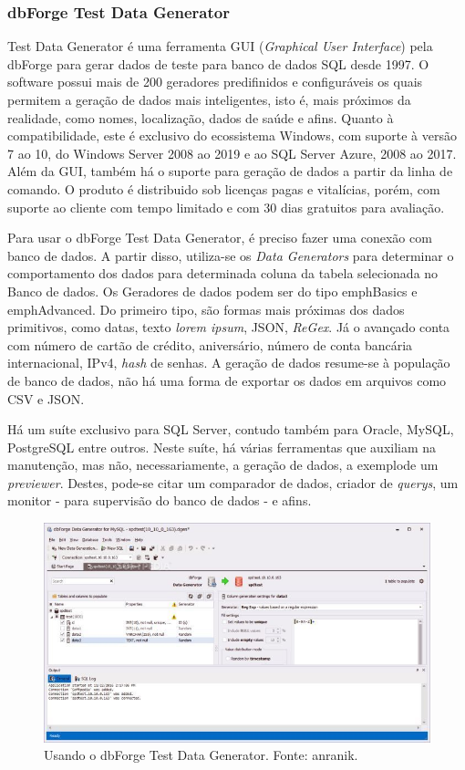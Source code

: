 \documentclass[
	12pt,				%
	openright,			%
	twoside,			%
	a4paper,			%
	english,			%
	brazil				%
	]{abntex2}
\begin{document}
	\subsubsection{dbForge Test Data Generator}
	Test Data Generator \cite{forgeDBDataGenerator} é uma ferramenta GUI (\emph{Graphical User Interface}) pela dbForge para gerar dados de teste para banco de dados SQL desde 1997.
	O software possui mais de 200 geradores predifinidos e configuráveis os quais permitem a geração de dados mais inteligentes, isto é, mais próximos da realidade, como nomes, localização, dados de saúde e afins.
	Quanto à compatibilidade, este é exclusivo do ecossistema Windows, com suporte à versão 7 ao 10, do Windows Server 2008 ao 2019 e ao SQL Server Azure, 2008 ao 2017.
	Além da GUI, também há o suporte para geração de dados a partir da linha de comando.
	O produto é distribuido sob licenças pagas e vitalícias, porém, com suporte ao cliente com tempo limitado e com 30 dias gratuitos para avaliação.
	\par
	Para usar o dbForge Test Data Generator, é preciso fazer uma conexão com banco de dados. 
	A partir disso, utiliza-se os \emph{Data Generators} para determinar o comportamento dos dados para determinada coluna da tabela selecionada no Banco de dados.
	Os Geradores de dados podem ser do tipo emph{Basics} e emph{Advanced}. 
	Do primeiro tipo, são formas mais próximas dos dados primitivos, como datas, texto \emph{lorem ipsum}, JSON, \emph{ReGex}.
	Já o avançado conta com número de cartão de crédito, aniversário, número de conta bancária internacional, IPv4, \emph{hash} de senhas.  
	A geração de dados resume-se à população de banco de dados, não há uma forma de exportar os dados em arquivos como CSV e JSON.
	\par
	Há um suíte exclusivo para SQL Server, contudo também para Oracle, MySQL, PostgreSQL entre outros.
	Neste suíte, há várias ferramentas que auxiliam na manutenção, mas não, necessariamente, a geração de dados, a exemplode um \emph{previewer}.
	Destes, pode-se citar um comparador de dados, criador de \emph{querys}, um monitor - para supervisão do banco de dados - e afins.
	\begin{figure}[h]
		\centering
		\includegraphics[width=\linewidth]{./figures/TrabalhosRelacionados/dbForge-Test-Data-Generator.jpg}
		\caption{Usando o dbForge Test Data Generator. Fonte: anranik.}
		\label{fig:dbForgeTDG}
	\end{figure}
\end{document}
